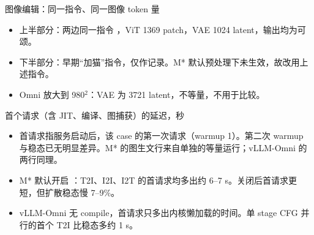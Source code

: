 \begin{frame}[t]{图像编辑：同一指令、同一图像 token 量}
\scriptsize\def\codesize{\relax}
\renewcommand{\arraystretch}{1.08}\setlength{\tabcolsep}{3pt}

\vspace{2pt}
\begin{itemize}\scriptsize\setlength\itemsep{0pt}
  \item 上半部分：两边同一指令 ，ViT 1369 patch，VAE 1024 latent，输出均为可颂。
  \item 下半部分：早期“加猫”指令，仅作记录。M* 默认预处理下未生效，故改用上述指令。
  \item Omni 放大到 980$^2$：VAE 为 3721 latent，不等量，不用于比较。
\end{itemize}
\end{frame}

\begin{frame}[t]{首个请求（含 JIT、编译、图捕获）的延迟，秒}
\scriptsize\def\codesize{\relax}
\renewcommand{\arraystretch}{1.12}\setlength{\tabcolsep}{3pt}

\vspace{4pt}
\begin{itemize}\scriptsize\setlength\itemsep{1pt}
  \item 首请求指服务启动后，该 case 的第一次请求（warmup 1）。第二次 warmup 与稳态已无明显差异。M* 的图生文行来自单独的等量运行；vLLM-Omni 的两行同理。
  \item M* 默认开启 ：T2I、I2I、I2T 的首请求均多出约 6--7 s。关闭后首请求更短，但扩散稳态慢 7--9\%。
  \item vLLM-Omni 无 compile，首请求只多出内核懒加载的时间。单 stage CFG 并行的首个 T2I 比稳态多约 1 s。
\end{itemize}
\end{frame}
